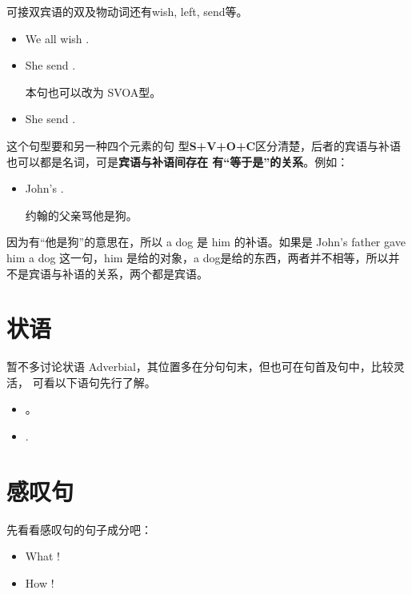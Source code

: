 可接双宾语的双及物动词还有wish, left, send等。
\begin{itemize}
\item We all wish  .

\item She send  .

  本句也可以改为 SVOA型。

\item She send  .

\end{itemize}


这个句型要和另一种四个元素的句
型\textbf{S+V+O+C}区分清楚，后者的宾语与补语也可以都是名词，可是\textbf{宾语与补语间存在
  有“等于是”的关系}。例如：
\begin{itemize}
\item John's    .

  约翰的父亲骂他是狗。
\end{itemize}

因为有“他是狗”的意思在，所以 a dog 是 him 的补语。如果是 John's father
gave him a dog 这一句，him 是给的对象，a dog是给的东西，两者并不相等，所以并
不是宾语与补语的关系，两个都是宾语。

\section{状语}

暂不多讨论状语 Adverbial，其位置多在分句句末，但也可在句首及句中，比较灵活，
可看以下语句先行了解。

\begin{itemize}
\item {}   
  。
\item {}    .
\end{itemize}

\section{感叹句}

先看看感叹句的句子成分吧：
\begin{itemize}
\item What   !
\item How    !
\end{itemize}

